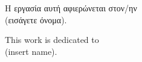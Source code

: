 \vspace*{7cm}

\begin{center}
\begin{minipage}{0.55\textwidth}
\centering
\begin{otherlanguage}{greek}
Η εργασία αυτή αφιερώνεται στον/ην\\
(εισάγετε όνομα).
\end{otherlanguage}

\vspace{2cm}

This work is dedicated to\\
(insert name).
\end{minipage}
\end{center}
